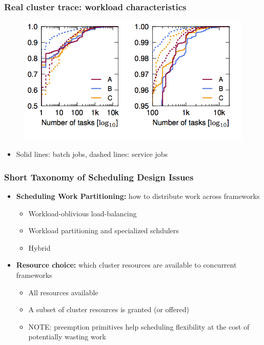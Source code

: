 \begin{frame}\frametitle{Real cluster trace: workload characteristics}
\begin{figure}[h]
  \centering
  \includegraphics[scale=0.4]{./figures/intro_trace2}
  \label{fig:intro_trace2}
\end{figure}
\begin{itemize}
	\item Solid lines: batch jobs, dashed lines: service jobs
\end{itemize}
\end{frame}

\begin{frame}\frametitle{Short Taxonomy of Scheduling Design Issues}
\begin{itemize}
	\item {\bf Scheduling Work Partitioning:} how to distribute work across frameworks
	\begin{itemize}
		\item Workload-oblivious load-balancing
		\item Workload partitioning and specialized schdulers
		\item Hybrid
	\end{itemize}

\vspace{20pt}

	\item {\bf Resource choice:} which cluster resources are available to concurrent frameworks
	\begin{itemize}
		\item All resources available
		\item A subset of cluster resources is granted (or offered)
		\item NOTE: preemption primitives help scheduling flexibility at the cost of potentially wasting work
	\end{itemize}
\end{itemize}
\end{frame}

